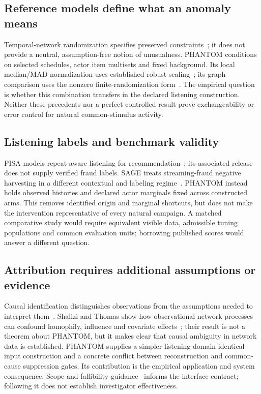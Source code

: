 \documentclass[11pt,letterpaper]{article}
\begin{document}
\subsection{Reference models define what an anomaly means}
Temporal-network randomization specifies preserved constraints~\cite{gauvin}; it does not provide a neutral, assumption-free notion of unusualness. PHANTOM conditions on selected schedules, actor item multisets and fixed background. Its local median/MAD normalization uses established robust scaling~\cite{rousseeuw}; its graph comparison uses the nonzero finite-randomization form~\cite{phipson}. The empirical question is whether this combination transfers in the declared listening construction. Neither these precedents nor a perfect controlled result prove exchangeability or error control for natural common-stimulus activity.

\subsection{Listening labels and benchmark validity}
PISA models repeat-aware listening for recommendation~\cite{pisa}; its associated release~\cite{deezerdata} does not supply verified fraud labels. SAGE treats streaming-fraud negative harvesting in a different contextual and labeling regime~\cite{sage}. PHANTOM instead holds observed histories and declared actor marginals fixed across constructed arms. This removes identified origin and marginal shortcuts, but does not make the intervention representative of every natural campaign. A matched comparative study would require equivalent visible data, admissible tuning populations and common evaluation units; borrowing published scores would answer a different question.

\subsection{Attribution requires additional assumptions or evidence}
Causal identification distinguishes observations from the assumptions needed to interpret them~\cite{pearl}. Shalizi and Thomas show how observational network processes can confound homophily, influence and covariate effects~\cite{shalizi}; their result is not a theorem about PHANTOM, but it makes clear that causal ambiguity in network data is established. PHANTOM supplies a simpler listening-domain identical-input construction and a concrete conflict between reconstruction and common-cause suppression gates. Its contribution is the empirical application and system consequence. Scope and fallibility guidance~\cite{amershi} informs the interface contract; following it does not establish investigator effectiveness.
\end{document}
